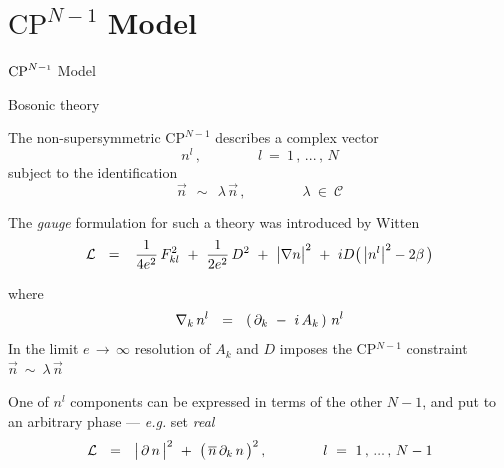 \documentclass{beamer}
\newcommand{\cp}{$\text{CP}^{N-1}$\,\,}
\begin{document}
\section{\cp Model}
\begin{frame}{}
\fontsize{60pt}{60pt}\selectfont
\begin{center}
        $\text{CP}^{N-\mathsmaller{1}}$ Model
\end{center}
\end{frame}


\begin{frame}{Bosonic theory}

	The non-supersymmetric \cp describes a complex vector 
\[
	n^l\,,\qquad\qquad l ~=~ 1\,,\, ...\,,\, N
\]
	subject to the identification
\[
	\vec{n} ~~\sim~~ \lambda\, \vec{n}\,,
	\qquad\qquad \lambda ~\in~ \mathcal{C}
\]


\end{frame}


\begin{frame}{}

	The {\it gauge} formulation for such a theory was introduced by Witten
\[
 	\mathcal{L} ~~=~~
		\,\frac{1}{4e^2}\,F_{kl}^2  ~+~  \frac{1}{2e^2}\, D^2  ~+~
		\big| \nabla n \big|^2  ~+~  iD \big(\, \big|n^l \big|^2 - 2\beta \,\big)
\]

	where 
\[
	\nabla_k\, n^l  ~~=~~  \left(\, \partial_k ~-~ i\,A_k \,\right)\, n^l
\]
	In the limit $ e \,\to\, \infty $ resolution of $ A_k $ and $ D $ imposes
	the CP$^{N-1}$ constraint $ \vec{n} ~\sim~ \lambda\, \vec{n} $

	One of $ n^l $ components can be expressed in terms of the other $ N - 1 $,
	and put to an arbitrary phase --- {\it e.g.} set {\it real}
\[
	\mathcal{L}  ~~=~~  \big|\, \partial\, n \,\big|^2  ~+~  \big(\, \overline{n}\, \partial_k \, n \,\big)^2\,,
	\qquad\qquad l ~=~ 1\,,\, ...\,,\, N-1
\]

\end{frame}
\end{document}
